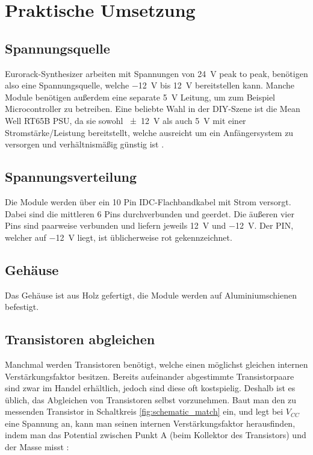 \chapter{Praktische Umsetzung}

\section{Spannungsquelle}
\label{sec:org81d4120}
Eurorack-Synthesizer arbeiten mit Spannungen von \SI{24}{\volt} peak to peak, benötigen also eine Spannungsquelle, welche \SI{-12}{\volt} bis \SI{+12}{\volt} bereitstellen kann. Manche Module benötigen außerdem eine separate \SI{5}{\volt} Leitung, um zum Beispiel Microcontroller zu betreiben. Eine beliebte Wahl in der DIY-Szene ist die Mean Well RT65B PSU, da sie sowohl \SI{\pm 12}{\volt} als auch \SI{5}{\volt} mit einer Stromstärke/Leistung bereitstellt, welche ausreicht um ein Anfängersystem zu versorgen und verhältnismäßig günstig ist \cite{modularsynthlab:rt65b}.

\section{Spannungsverteilung}
\label{sec:orgd2732ee}
Die Module werden über ein 10 Pin IDC-Flachbandkabel mit Strom versorgt. Dabei sind die mittleren 6 Pins durchverbunden und geerdet. Die äußeren vier Pins sind paarweise verbunden und liefern jeweils \SI{+12}{\volt} und \SI{-12}{\volt}. Der PIN, welcher auf \SI{-12}{\volt} liegt, ist üblicherweise rot gekennzeichnet.

\section{Gehäuse}
\label{sec:org236f03f}
Das Gehäuse ist aus Holz gefertigt, die Module werden auf Aluminiumschienen befestigt.

\section{Transistoren abgleichen \label{Match_Transistors}}
\label{sec:orgccc1b79}
Manchmal werden Transistoren benötigt, welche einen möglichst gleichen internen Verstärkungsfaktor besitzen. Bereits aufeinander abgestimmte Transistorpaare sind zwar im Handel erhältlich, jedoch sind diese oft kostspielig. Deshalb ist es üblich, das Abgleichen von Transistoren selbst vorzunehmen. Baut man den zu messenden Transistor in Schaltkreis \ref{fig:schematic_match} ein, und legt bei \(V_{CC}\) eine Spannung an, kann man seinen internen Verstärkungsfaktor herausfinden, indem man das Potential zwischen Punkt A (beim Kollektor des Transistors) und der Masse misst \cite{match_transistors}:

